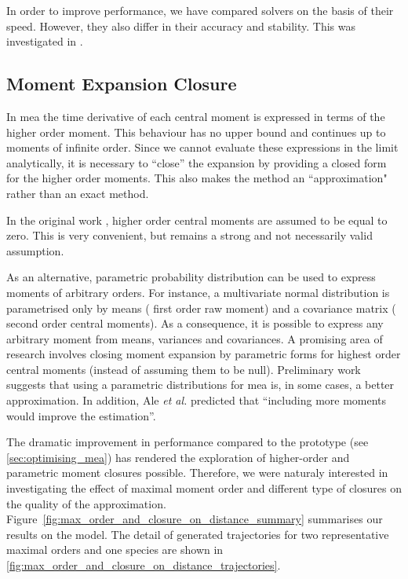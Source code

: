 In order to improve performance, we have compared solvers on the basis of their speed.
However, they also differ in their accuracy and stability.
This was investigated in  .

\subsection{Moment Expansion Closure}

In \gls{mea} the time derivative of each central moment is expressed in terms of the higher order moment.
This behaviour has no upper bound and continues up to moments of infinite order.
Since we cannot evaluate these expressions in the limit analytically, it is necessary to ``close'' the expansion by providing a closed form for the higher order moments.
This also makes the method an ``approximation" rather than an exact method.

In the original work \cite{ale_general_2013}, higher order central moments are assumed to be equal to zero.
This is very convenient, but remains a strong and not necessarily valid assumption.

As an alternative, parametric probability distribution can be used to express moments of arbitrary orders.
For instance, a multivariate normal distribution is parametrised only by means (\ie{} first order raw moment)
and a covariance matrix (\ie{} second order central moments).
As a consequence, it is possible to express any arbitrary moment from means, variances and covariances.
A promising area of research involves closing moment expansion by parametric forms for highest order central moments (instead of assuming them to be null).
Preliminary work \cite{lakatos_preparation_2014} suggests that using a parametric distributions for \gls{mea} is, in some cases, a better approximation.
In addition, Ale \emph{et al.} predicted that ``including more moments would improve the estimation''\cite{ale_general_2013}.

The dramatic improvement in performance compared to the \mat{} prototype (see \autoref{sec:optimising_mea}) has rendered the exploration of higher-order and parametric moment closures possible.
Therefore, we were naturaly interested in investigating the effect of maximal moment order and different type of closures on the quality of the approximation.
Figure~\ref{fig:max_order_and_closure_on_distance_summary} summarises our results on the \pft{} model. 
The detail of generated trajectories for two representative maximal orders and one species are shown in
\autoref{fig:max_order_and_closure_on_distance_trajectories}.

